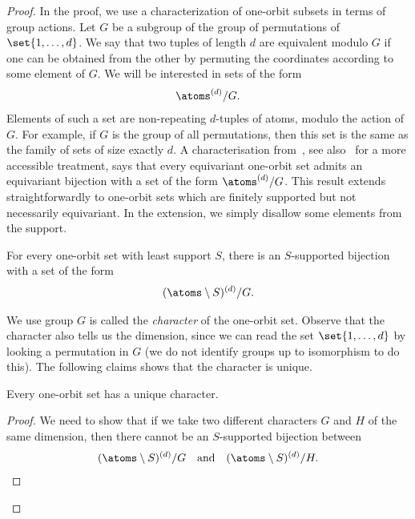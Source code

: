 \begin{proof}
    In the proof, we  use a characterization of one-orbit subsets in terms of group actions. Let  $G$ be a subgroup of the group of permutations of $\set{1,\ldots,d}$. We say that two tuples of length $d$   are equivalent modulo $G$ if one can be obtained from the other by permuting the coordinates according to some element of $G$.  We will be interested in sets of the form 
    \begin{align*}
    \atoms^{(d)} / G.
    \end{align*}
    Elements of such a set are non-repeating $d$-tuples of atoms, modulo the action of $G$. For example, if $G$ is the group of all permutations, then this set is the same as the family of sets of size exactly $d$. A characterisation from~\cite[Section 9.3]{bojanczyk2014automata}, see also~\cite[Theorem 4.18]{bojanczyk_slightly2018} for a more accessible treatment, says that 
     every equivariant one-orbit set admits an equivariant bijection with a set of the form $\atoms^{(d)}/G$. This result extends straightforwardly to one-orbit sets which are finitely supported but not necessarily equivariant. In the extension, we simply disallow some elements from the support.
     \begin{claim}\label{claim:one-orbit-set-characterisation}
        For every  one-orbit set with least support $S$, there is an $S$-supported bijection with a set of the form 
        \begin{align*}
        (\atoms \setminus S)^{(d)}/G.
        \end{align*}
     \end{claim}
    We use group $G$ is called the \emph{character} of the one-orbit set. Observe that the character also tells us the dimension, since we can read the set $\set{1,\ldots,d}$ by looking a permutation in $G$ (we do not identify groups up to isomorphism to do this). 
    The following claims shows that the character is unique.
    \begin{claim}
        \label{claim:character-unique}
        Every one-orbit set has a unique character.
    \end{claim}
    \begin{proof}
        We need to show that if we take two different characters $G$ and $H$ of the same dimension, then there cannot be an $S$-supported bijection between 
        \begin{align*}
        (\atoms \setminus S)^{(d)}/G \quad \text{and} \quad (\atoms \setminus S)^{(d)}/H.
        \end{align*}

\end{proof}
\end{proof}
